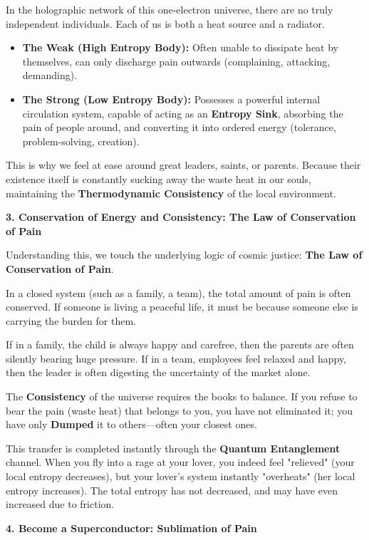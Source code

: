 In the holographic network of this one-electron universe, there are no truly independent individuals. Each of us is both a heat source and a radiator.

\begin{itemize}
\item \textbf{The Weak (High Entropy Body):} Often unable to dissipate heat by themselves, can only discharge pain outwards (complaining, attacking, demanding).
\item \textbf{The Strong (Low Entropy Body):} Possesses a powerful internal circulation system, capable of acting as an \textbf{Entropy Sink}, absorbing the pain of people around, and converting it into ordered energy (tolerance, problem-solving, creation).
\end{itemize}

This is why we feel at ease around great leaders, saints, or parents. Because their existence itself is constantly sucking away the waste heat in our souls, maintaining the \textbf{Thermodynamic Consistency} of the local environment.

\textbf{3. Conservation of Energy and Consistency: The Law of Conservation of Pain}

Understanding this, we touch the underlying logic of cosmic justice: \textbf{The Law of Conservation of Pain}.

In a closed system (such as a family, a team), the total amount of pain is often conserved. If someone is living a peaceful life, it must be because someone else is carrying the burden for them.

If in a family, the child is always happy and carefree, then the parents are often silently bearing huge pressure.
If in a team, employees feel relaxed and happy, then the leader is often digesting the uncertainty of the market alone.

The \textbf{Consistency} of the universe requires the books to balance. If you refuse to bear the pain (waste heat) that belongs to you, you have not eliminated it; you have only \textbf{Dumped} it to others—often your closest ones.

This transfer is completed instantly through the \textbf{Quantum Entanglement} channel. When you fly into a rage at your lover, you indeed feel "relieved" (your local entropy decreases), but your lover's system instantly "overheats" (her local entropy increases). The total entropy has not decreased, and may have even increased due to friction.

\textbf{4. Become a Superconductor: Sublimation of Pain}

